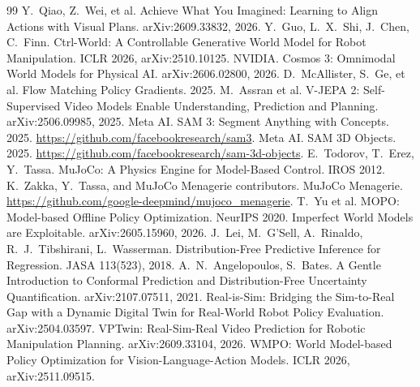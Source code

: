 \cleardoublepage{}
\begin{thebibliography}{99}\small
{} Y.~Qiao, Z.~Wei, et al. Achieve What You Imagined: Learning to Align Actions with Visual Plans. arXiv:2609.33832, 2026.
 Y.~Guo, L.~X.~Shi, J.~Chen, C.~Finn. Ctrl-World: A Controllable Generative World Model for Robot Manipulation. ICLR 2026, arXiv:2510.10125.
 NVIDIA. Cosmos 3: Omnimodal World Models for Physical AI. arXiv:2606.02800, 2026.
 D.~McAllister, S.~Ge, et al. Flow Matching Policy Gradients. 2025.
 M.~Assran et al. V-JEPA 2: Self-Supervised Video Models Enable Understanding, Prediction and Planning. arXiv:2506.09985, 2025.
 Meta AI. SAM 3: Segment Anything with Concepts. 2025. \url{https://github.com/facebookresearch/sam3}.
 Meta AI. SAM 3D Objects. 2025. \url{https://github.com/facebookresearch/sam-3d-objects}.
 E.~Todorov, T.~Erez, Y.~Tassa. MuJoCo: A Physics Engine for Model-Based Control. IROS 2012.
 K.~Zakka, Y.~Tassa, and MuJoCo Menagerie contributors. MuJoCo Menagerie. \url{https://github.com/google-deepmind/mujoco_menagerie}.
 T.~Yu et al. MOPO: Model-based Offline Policy Optimization. NeurIPS 2020.
 Imperfect World Models are Exploitable. arXiv:2605.15960, 2026.
 J.~Lei, M.~G'Sell, A.~Rinaldo, R.~J.~Tibshirani, L.~Wasserman. Distribution-Free Predictive Inference for Regression. JASA 113(523), 2018.
 A.~N.~Angelopoulos, S.~Bates. A Gentle Introduction to Conformal Prediction and Distribution-Free Uncertainty Quantification. arXiv:2107.07511, 2021.
 Real-is-Sim: Bridging the Sim-to-Real Gap with a Dynamic Digital Twin for Real-World Robot Policy Evaluation. arXiv:2504.03597.
 VPTwin: Real-Sim-Real Video Prediction for Robotic Manipulation Planning. arXiv:2609.33104, 2026.
 WMPO: World Model-based Policy Optimization for Vision-Language-Action Models. ICLR 2026, arXiv:2511.09515.
\end{thebibliography}

